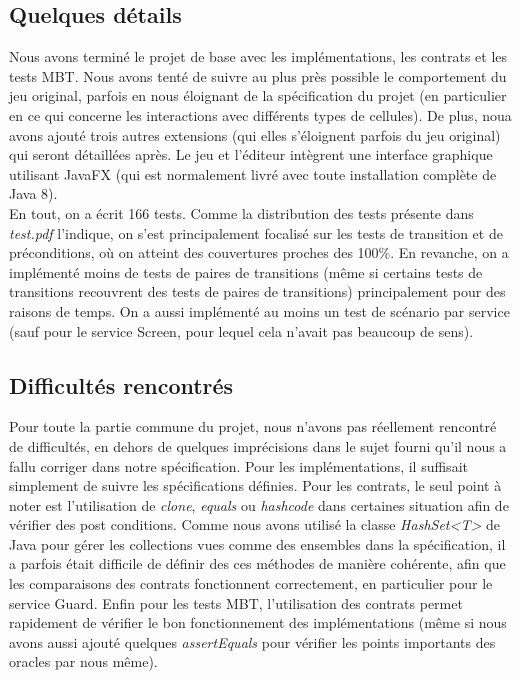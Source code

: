 \documentclass{article}
\begin{document}
\subsection{Quelques détails}

Nous avons terminé le projet de base avec les implémentations, les contrats et les tests MBT. Nous avons tenté de suivre au plus près possible le comportement du jeu original, parfois en nous éloignant de la spécification du projet (en particulier en ce qui concerne les interactions avec différents types de cellules). De plus, noua avons ajouté trois autres extensions (qui elles s'éloignent parfois du jeu original) qui seront détaillées après. Le jeu et l'éditeur intègrent une interface graphique utilisant JavaFX (qui est normalement livré avec toute installation complète de Java 8).\\

En tout, on a écrit 166 tests. Comme la distribution des tests présente dans \textit{test.pdf} l'indique, on s'est principalement focalisé sur les tests de transition et de préconditions, où on atteint des couvertures proches des 100\%. En revanche, on a implémenté moins de tests de paires de transitions (même si certains tests de transitions recouvrent des tests de paires de transitions) principalement pour des raisons de temps. On a aussi implémenté au moins un test de scénario par service (sauf pour le service \textrm{Screen}, pour lequel cela n'avait pas beaucoup de sens).

\subsection{Difficultés rencontrés}

Pour toute la partie commune du projet, nous n'avons pas réellement rencontré de difficultés, en dehors de quelques imprécisions dans le sujet fourni qu'il nous a fallu corriger dans notre spécification. Pour les implémentations, il suffisait simplement de suivre les spécifications définies. Pour les contrats, le seul point à noter est l'utilisation de \textit{clone}, \textit{equals} ou \textit{hashcode} dans certaines situation afin de vérifier des post conditions. Comme nous avons utilisé la classe \textit{HashSet<T>} de Java pour gérer les collections vues comme des ensembles dans la spécification, il a parfois était difficile de définir des ces méthodes de manière cohérente, afin que les comparaisons des contrats fonctionnent correctement, en particulier pour le service \textrm{Guard}. Enfin pour les tests MBT, l'utilisation des contrats permet rapidement de vérifier le bon fonctionnement des implémentations (même si nous avons aussi ajouté quelques \textit{assertEquals} pour vérifier les points importants des oracles par nous même).\\
\end{document}

